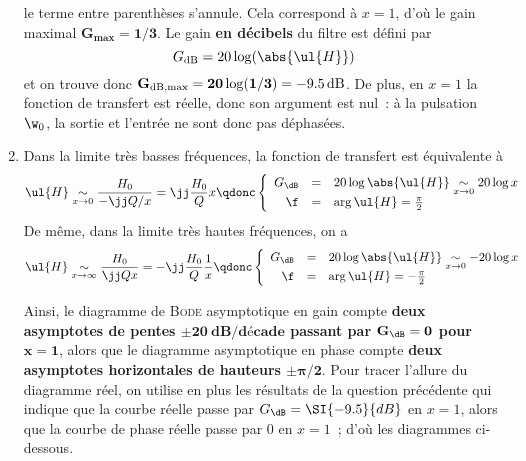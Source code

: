 \documentclass[a4paper, 12pt, final, garamond]{book}
\begin{document}
\begin{enumerate}
        le terme entre parenthèses s'annule. Cela correspond à $x=1$, d'où le
        gain maximal $\mathbf{G_{\max} = 1/3}$. \bigbreak
        Le gain \textbf{en décibels} du filtre est défini par
        \[G_{\rm dB} = 20\log(\abs{\ul{H}})\]
        et on trouve donc $\mathbf{G_{\rm dB, max} = 20\log(1/3) =
        \SI{-9.5}{dB}}$. De plus, en $x = 1$ la fonction de transfert est
        réelle, donc son argument est nul~: à la pulsation $\w_0$, la sortie et
        l'entrée ne sont donc pas déphasées.
    \item Dans la limite très basses fréquences, la fonction de transfert est
        équivalente à
        \[\ul{H}
            \underset{x\rightarrow0}{\sim} \frac{H_0}{-\jj Q/x}
            = \jj \frac{H_0}{Q} x
            \qdonc
            \left\{
                \begin{array}{rcl}
                    G_{\dB} & = & 20\log\abs{\ul{H}}
                    \underset{x\rightarrow0}{\sim} 20 \log x\\
                    \f & = & \arg \ul{H} = \frac{\pi}{2}
                \end{array}
            \right.
        \]
        De même, dans la limite très hautes fréquences, on a
        \[\ul{H}
            \underset{x\rightarrow\infty}{\sim} \frac{H_0}{\jj Qx}
            = -\jj \frac{H_0}{Q} \frac{1}{x}
            \qdonc
            \left\{
                \begin{array}{rcl}
                    G_{\dB} & = & 20\log\abs{\ul{H}}
                    \underset{x\rightarrow0}{\sim} -20 \log x\\
                    \f & = & \arg \ul{H} = -\frac{\pi}{2}
                \end{array}
            \right.
        \]

        Ainsi, le diagramme de \textsc{Bode} asymptotique en gain compte
        \textbf{deux asymptotes de pentes $\mathbf{\pm\SI{20}{dB/décade}}$
        passant par $\mathbf{G_{\dB} = 0}$ pour $\mathbf{x=1}$}, alors que le
        diagramme asymptotique en phase compte \textbf{deux asymptotes
        horizontales de hauteurs $\mathbf{\pm \pi/2}$}. \bigbreak
        Pour tracer l'allure du diagramme réel, on utilise en plus les résultats
        de la question précédente qui indique que la courbe réelle passe par
        $G_{\dB} = \SI{-9.5}{dB}$ en $x=1$, alors que la courbe de phase réelle
        passe par $0$ en $x=1$~; d'où les diagrammes ci-dessous.


\end{enumerate}
\end{document}
